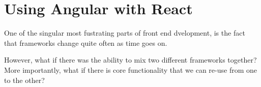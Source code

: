 \chapter{ Using Angular with React }

One of the singular most fustrating parts of front end dvelopment, is the fact
that frameworks change quite often as time goes on. 

However, what if there was the
ability to mix two different frameworks together? More importantly, what if
there is core functionality that we can re-use from one to the other?

